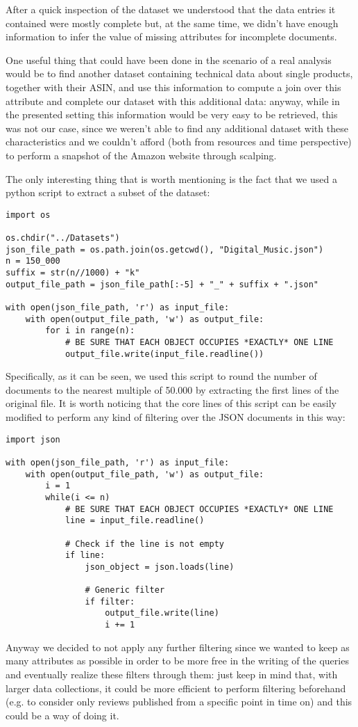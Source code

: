 After a quick inspection of the dataset we understood that the data entries it contained were mostly complete but, at the same time, we didn't have enough information to infer the value of missing attributes for incomplete documents.

One useful thing that could have been done in the scenario of a real analysis would be to find another dataset containing technical data about single products, together with their ASIN, and use this information to compute a join over this attribute and complete our dataset with this additional data: anyway, while in the presented setting this information would be very easy to be retrieved, this was not our case, since we weren't able to find any additional dataset with these characteristics and we couldn't afford (both from resources and time perspective) to perform a snapshot of the Amazon website through scalping. 

The only interesting thing that is worth mentioning is the fact that we used a python script to extract a subset of the dataset:\\
\begin{verbatim}
import os

os.chdir("../Datasets")
json_file_path = os.path.join(os.getcwd(), "Digital_Music.json")
n = 150_000
suffix = str(n//1000) + "k"
output_file_path = json_file_path[:-5] + "_" + suffix + ".json"

with open(json_file_path, 'r') as input_file:
    with open(output_file_path, 'w') as output_file:
        for i in range(n):
            # BE SURE THAT EACH OBJECT OCCUPIES *EXACTLY* ONE LINE
            output_file.write(input_file.readline())
\end{verbatim}

Specifically, as it can be seen, we used this script to round the number of documents to the nearest multiple of 50.000 by extracting the first lines of the original file.
It is worth noticing that the core lines of this script can be easily modified to perform any kind of filtering over the JSON documents in this way:\\
\begin{verbatim}
import json

with open(json_file_path, 'r') as input_file:
    with open(output_file_path, 'w') as output_file:
        i = 1
        while(i <= n)
            # BE SURE THAT EACH OBJECT OCCUPIES *EXACTLY* ONE LINE
            line = input_file.readline()

            # Check if the line is not empty
            if line:
                json_object = json.loads(line)

                # Generic filter
                if filter:
                    output_file.write(line)
                    i += 1
\end{verbatim}
Anyway we decided to not apply any further filtering since we wanted to keep as many attributes as possible in order to be more free in the writing of the queries and eventually realize these filters through them: just keep in mind that, with larger data collections, it could be more efficient to perform filtering beforehand (e.g. to consider only reviews published from a specific point in time on) and this could be a way of doing it.